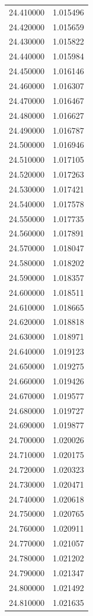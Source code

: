 \begin{tabular}{rr}
24.410000 & 1.015496 \\
24.420000 & 1.015659 \\
24.430000 & 1.015822 \\
24.440000 & 1.015984 \\
24.450000 & 1.016146 \\
24.460000 & 1.016307 \\
24.470000 & 1.016467 \\
24.480000 & 1.016627 \\
24.490000 & 1.016787 \\
24.500000 & 1.016946 \\
24.510000 & 1.017105 \\
24.520000 & 1.017263 \\
24.530000 & 1.017421 \\
24.540000 & 1.017578 \\
24.550000 & 1.017735 \\
24.560000 & 1.017891 \\
24.570000 & 1.018047 \\
24.580000 & 1.018202 \\
24.590000 & 1.018357 \\
24.600000 & 1.018511 \\
24.610000 & 1.018665 \\
24.620000 & 1.018818 \\
24.630000 & 1.018971 \\
24.640000 & 1.019123 \\
24.650000 & 1.019275 \\
24.660000 & 1.019426 \\
24.670000 & 1.019577 \\
24.680000 & 1.019727 \\
24.690000 & 1.019877 \\
24.700000 & 1.020026 \\
24.710000 & 1.020175 \\
24.720000 & 1.020323 \\
24.730000 & 1.020471 \\
24.740000 & 1.020618 \\
24.750000 & 1.020765 \\
24.760000 & 1.020911 \\
24.770000 & 1.021057 \\
24.780000 & 1.021202 \\
24.790000 & 1.021347 \\
24.800000 & 1.021492 \\
24.810000 & 1.021635 \\

\end{tabular}
